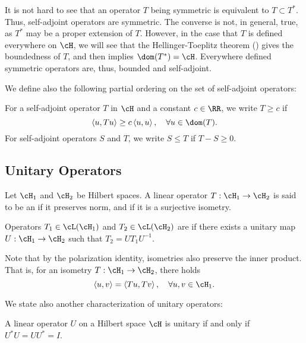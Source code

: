 \documentclass[oneside,reqno,letterpaper]{amsart}
\begin{document}
It is not hard to see that an operator \(T\) being symmetric is equivalent to \(T \subset T^*\).
Thus, self-adjoint operators are symmetric. 
The converse is not, in general, true, as \(T^*\) may be a proper extension of \(T\). 
However, in the case that \(T\) is defined everywhere on \(\cH\), we will see that the Hellinger-Toeplitz theorem () gives the boundedness of \(T\), and  then implies \(\dom(T^*) = \cH\). 
Everywhere defined symmetric operators are, thus, bounded and self-adjoint. 

We define also the following partial ordering on the set of self-adjoint operators: 
\begin{definition}
\label{def:self-adjoint-partial-ordering}
  For a self-adjoint operator \(T\) in \(\cH\) and a constant \(c \in \RR\), we write \(T \geq c\) if 
  \[
  \left< u, Tu \right> \geq c \left< u, u \right>, \quad \forall u \in \dom(T). 
  \] 
  For self-adjoint operators \(S\) and \(T\), we write \(S \leq T\) if \(T - S \geq 0\). 
\end{definition}





\subsection{Unitary Operators}

\begin{definition}
  Let \(\cH_1\) and \(\cH_2\) be Hilbert spaces. A linear operator \(T: \cH_1 \to \cH_2\) is said to be 
  an  if it preserves norm, and 
   if it is a surjective isometry. 

  Operators \(T_1 \in \cL(\cH_1)\) and \(T_2 \in \cL(\cH_2)\) are  if there exists a unitary map \(U: \cH_1 \to \cH_2\) such that \(T_2 = U T_1 U^{-1}\). 
\end{definition}

Note that by the polarization identity, isometries also preserve the inner product. That is, for an isometry \(T: \cH_1 \to \cH_2\), there holds 
\[
\left< u, v \right> = \left< Tu, Tv \right>, \quad \forall u, v \in \cH_1 . 
\]

We state also another characterization of unitary operators: 

\begin{proposition}
\label{thm:unitary-characterization}
  A linear operator \(U\) on a Hilbert space \(\cH\) is unitary if and only if \(U^* U = U U^* = I\). 
\end{proposition}
\end{document}
